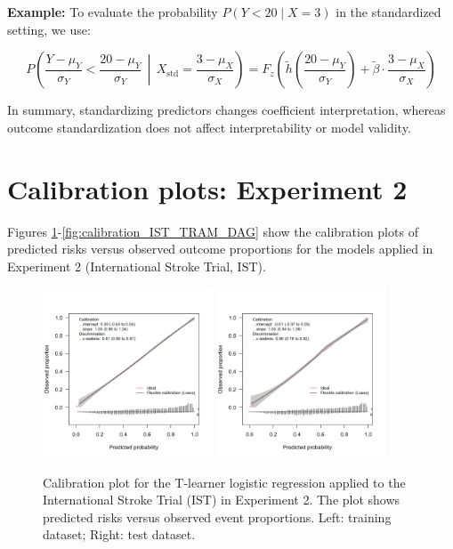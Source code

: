 \textbf{Example:} To evaluate the probability \( P(Y < 20 \mid X = 3) \) in the standardized setting, we use:


\[
P\left(\frac{Y - \mu_Y}{\sigma_Y} < \frac{20 - \mu_Y}{\sigma_Y} \,\middle|\, X_{\text{std}} = \frac{3 - \mu_X}{\sigma_X} \right)
= F_z\left(\tilde{h}\left(\frac{20 - \mu_Y}{\sigma_Y}\right) + \tilde{\beta} \cdot \frac{3 - \mu_X}{\sigma_X} \right)
\]


In summary, standardizing predictors changes coefficient interpretation, whereas outcome standardization does not affect interpretability or model validity.






\section{Calibration plots: Experiment 2} \label{sec:calibrations_experiment2}

Figures \ref{fig:calibration_IST_glm}-\ref{fig:calibration_IST_TRAM_DAG} show the calibration plots of predicted risks versus observed outcome proportions for the models applied in Experiment 2 (International Stroke Trial, IST).



\begin{figure}[htbp]
\centering
\includegraphics[width=0.45\textwidth]{img/results_IST/glm_tlearner_train_calibration_plot.png}
\includegraphics[width=0.45\textwidth]{img/results_IST/glm_tlearner_test_calibration_plot.png}
\caption{Calibration plot for the T-learner logistic regression applied to the International Stroke Trial (IST) in Experiment 2. The plot shows predicted risks versus observed event proportions. Left: training dataset; Right: test dataset.}
\label{fig:calibration_IST_glm}
\end{figure}


